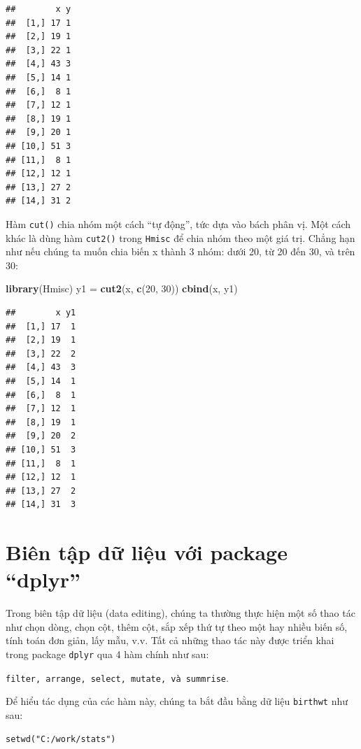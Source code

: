 \documentclass[
]{book}
\newenvironment{Shaded}{\begin{snugshade}}{\end{snugshade}}
\newcommand{\DecValTok}[1]{\textcolor[rgb]{0.00,0.00,0.81}{#1}}
\newcommand{\KeywordTok}[1]{\textcolor[rgb]{0.13,0.29,0.53}{\textbf{#1}}}
\newcommand{\NormalTok}[1]{#1}
\newcommand{\StringTok}[1]{\textcolor[rgb]{0.31,0.60,0.02}{#1}}
\begin{document}
\begin{verbatim}
##        x y
##  [1,] 17 1
##  [2,] 19 1
##  [3,] 22 1
##  [4,] 43 3
##  [5,] 14 1
##  [6,]  8 1
##  [7,] 12 1
##  [8,] 19 1
##  [9,] 20 1
## [10,] 51 3
## [11,]  8 1
## [12,] 12 1
## [13,] 27 2
## [14,] 31 2
\end{verbatim}

Hàm \texttt{cut()} chia nhóm một cách ``tự động'', tức dựa vào bách phân vị. Một cách khác là dùng hàm \texttt{cut2()} trong \texttt{Hmisc} để chia nhóm theo một giá trị. Chẳng hạn như nếu chúng ta muốn chia biến x thành 3 nhóm: dưới 20, từ 20 đến 30, và trên 30:

\begin{Shaded}
\begin{Highlighting}[]
\KeywordTok{library}\NormalTok{(Hmisc)}
\NormalTok{y1 =}\StringTok{ }\KeywordTok{cut2}\NormalTok{(x, }\KeywordTok{c}\NormalTok{(}\DecValTok{20}\NormalTok{, }\DecValTok{30}\NormalTok{))}
\KeywordTok{cbind}\NormalTok{(x, y1)}
\end{Highlighting}
\end{Shaded}

\begin{verbatim}
##        x y1
##  [1,] 17  1
##  [2,] 19  1
##  [3,] 22  2
##  [4,] 43  3
##  [5,] 14  1
##  [6,]  8  1
##  [7,] 12  1
##  [8,] 19  1
##  [9,] 20  2
## [10,] 51  3
## [11,]  8  1
## [12,] 12  1
## [13,] 27  2
## [14,] 31  3
\end{verbatim}

\hypertarget{biuxean-tux1eadp-dux1eef-liux1ec7u-vux1edbi-package-dplyr}{%
\section{Biên tập dữ liệu với package ``dplyr''}\label{biuxean-tux1eadp-dux1eef-liux1ec7u-vux1edbi-package-dplyr}}

Trong biên tập dữ liệu (data editing), chúng ta thường thực hiện một số thao tác như chọn dòng, chọn cột, thêm cột, sắp xếp thứ tự theo một hay nhiều biến số, tính toán đơn giản, lấy mẫu, v.v. Tất cả những thao tác này được triển khai trong package \texttt{dplyr} qua 4 hàm chính như sau:

\texttt{filter,\ arrange,\ select,\ mutate,\ và\ summrise}.

Để hiểu tác dụng của các hàm này, chúng ta bắt đầu bằng dữ liệu \texttt{birthwt} như sau:

\begin{verbatim}
setwd("C:/work/stats")
\end{verbatim}
\end{document}
